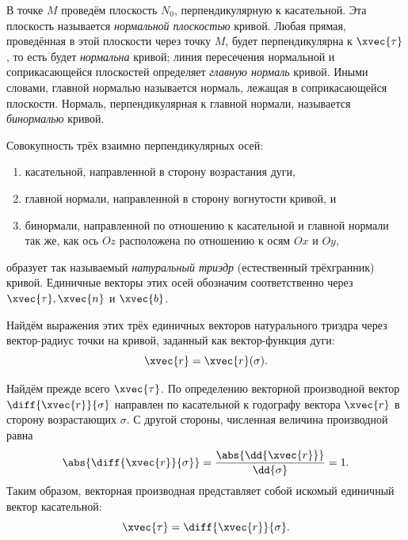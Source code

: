 В точке $M$ проведём плоскость $N_0$, перпендикулярную к касательной. Эта
плоскость называется \textit{нормальной плоскостью} кривой. Любая прямая,
проведённая в этой плоскости через точку $M$, будет перпендикулярна к
$\xvec{\tau}$, то есть будет \textit{нормальна} кривой; линия пересечения
нормальной и соприкасающейся плоскостей определяет \textit{главную нормаль}
кривой. Иными словами, главной нормалью называется нормаль, лежащая в
соприкасающейся плоскости. Нормаль, перпендикулярная к главной нормали,
называется \textit{бинормалью} кривой.

\begin{definition}
  Совокупность трёх взаимно перпендикулярных осей:
  \begin{enumerate}
    \item касательной, направленной в сторону возрастания дуги,
    \item главной нормали, направленной в сторону вогнутости кривой, и
    \item бинормали, направленной по отношению к касательной и главной нормали
      так же, как ось $Oz$ расположена по отношению к осям $Ox$ и $Oy$,
  \end{enumerate}
  образует так называемый \textit{натуральный триэдр}
  (естественный трёхгранник) кривой. Единичные векторы этих осей обозначим
  соответственно через $\xvec{\tau}, \xvec{n}$ и $\xvec{b}$.
\end{definition}

Найдём выражения этих трёх единичных векторов натурального триэдра через
вектор-радиус точки на кривой, заданный как вектор-функция дуги:
\begin{equation}
  \xvec{r} = \xvec{r}(\sigma).
\end{equation}

Найдём прежде всего $\xvec{\tau}$. По определению векторной производной вектор
${\displaystyle \diff{\xvec{r}}{\sigma}}$ направлен по касательной к годографу
вектора $\xvec{r}$ в сторону возрастающих $\sigma$. С другой стороны, численная
величина производной равна
\begin{equation*}
  \abs{\diff{\xvec{r}}{\sigma}} = \frac{\abs{\dd{\xvec{r}}}}{\dd{\sigma}} = 1.
\end{equation*}
Таким образом, векторная производная представляет собой искомый единичный
вектор касательной:
\begin{equation}
  \xvec{\tau} = \diff{\xvec{r}}{\sigma}.
\end{equation}

